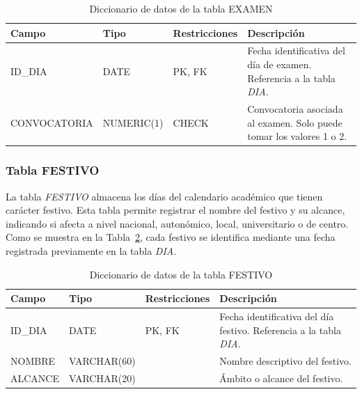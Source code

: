 \begin{table}[H]
	\centering
	\scriptsize
	\setlength{\tabcolsep}{3pt}
	\renewcommand{\arraystretch}{1.15}
	\begin{tabularx}{\textwidth}{@{}
			>{\raggedright\arraybackslash}p{2.6cm}
			>{\raggedright\arraybackslash}p{2.2cm}
			>{\raggedright\arraybackslash}p{2.2cm}
			X@{}}
		\toprule
		\textbf{Campo} & \textbf{Tipo} & \textbf{Restricciones} & \textbf{Descripción} \\
		\midrule
		ID\_DIA & DATE & PK, FK & Fecha identificativa del día de examen. Referencia a la tabla \textit{DIA}. \\
		CONVOCATORIA & NUMERIC(1) & CHECK & Convocatoria asociada al examen. Solo puede tomar los valores 1 o 2. \\
		\bottomrule
	\end{tabularx}
	\caption{Diccionario de datos de la tabla EXAMEN}
	\label{tab:diccionario-examen}
\end{table}

\subsubsection{Tabla FESTIVO}

\noindent La tabla \textit{FESTIVO} almacena los días del calendario académico que tienen carácter festivo. Esta tabla permite registrar el nombre del festivo y su alcance, indicando si afecta a nivel nacional, autonómico, local, universitario o de centro. Como se muestra en la Tabla~\ref{tab:diccionario-festivo}, cada festivo se identifica mediante una fecha registrada previamente en la tabla \textit{DIA}.\\

\begin{table}[H]
	\centering
	\scriptsize
	\setlength{\tabcolsep}{3pt}
	\renewcommand{\arraystretch}{1.15}
	\begin{tabularx}{\textwidth}{@{}
			>{\raggedright\arraybackslash}p{2.6cm}
			>{\raggedright\arraybackslash}p{2.2cm}
			>{\raggedright\arraybackslash}p{2.2cm}
			X@{}}
		\toprule
		\textbf{Campo} & \textbf{Tipo} & \textbf{Restricciones} & \textbf{Descripción} \\
		\midrule
		ID\_DIA & DATE & PK, FK & Fecha identificativa del día festivo. Referencia a la tabla \textit{DIA}. \\
		NOMBRE & VARCHAR(60) &  & Nombre descriptivo del festivo. \\
		ALCANCE & VARCHAR(20) &  & Ámbito o alcance del festivo. \\
		\bottomrule
	\end{tabularx}
	\caption{Diccionario de datos de la tabla FESTIVO}
	\label{tab:diccionario-festivo}
\end{table}

